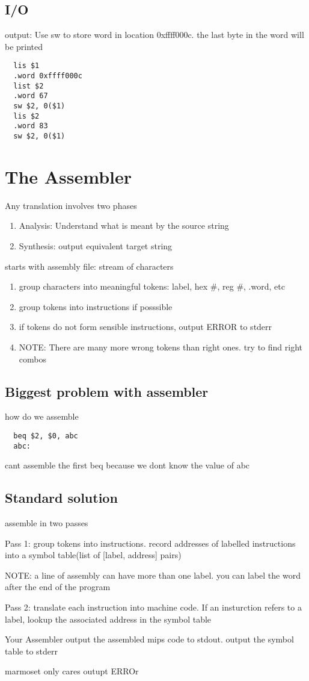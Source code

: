 \documentclass[11pt]{amsart}
\begin{document}
\subsection{I/O}
\par output:  Use sw to store word in location 0xffff000c. the last byte in the
word will be printed
\begin{verbatim}
  lis $1
  .word 0xffff000c
  list $2
  .word 67
  sw $2, 0($1)
  lis $2
  .word 83
  sw $2, 0($1)
\end{verbatim}
\section{The Assembler}
\par Any translation involves two phases
\begin{enumerate}
  \item Analysis: Understand what is meant by the source string
  \item Synthesis: output equivalent target string
\end{enumerate}
\par starts with assembly file: stream of characters
\begin{enumerate}
  \item group characters into meaningful tokens: label, hex \#, reg \#, .word, etc
  \item group tokens into instructions if posssible
  \item if tokens do not form sensible instructions, output ERROR to stderr
  \item NOTE: There are many more wrong tokens than right ones. try to find right
    combos
\end{enumerate}
\subsection{Biggest problem with assembler}
\par how do we assemble
\begin{verbatim}
  beq $2, $0, abc
  abc:
\end{verbatim}
\par cant assemble the first beq because we dont know the value of abc
\subsection{Standard solution}
\par assemble in two passes
\par Pass 1: group tokens into instructions. record addresses of labelled
instructions into a symbol table(list of [label, address] pairs)
\par NOTE: a line of assembly can have more than one label. you can label the
word after the end of the program
\par Pass 2: translate each instruction into machine code. If an insturction
refers to a label, lookup the associated address in the symbol table
\par Your Assembler output the assembled mips code to stdout. output the symbol
table to stderr
\par marmoset only cares outupt ERROr
\end{document}

